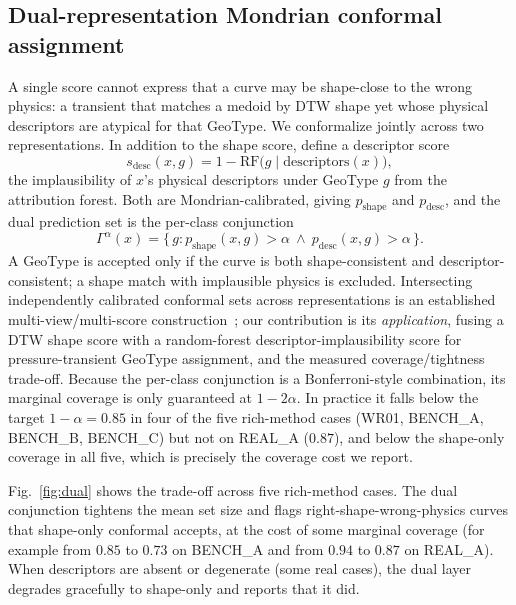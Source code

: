\documentclass[journal]{IEEEtran}
\begin{document}
\subsection{Dual-representation Mondrian conformal assignment}

A single score cannot express that a curve may be shape-close to the wrong physics: a transient
that matches a medoid by DTW shape yet whose physical descriptors are atypical for that GeoType. We
conformalize jointly across two representations. In addition to the shape score, define a descriptor
score
\begin{equation}
s_\text{desc}(x,g)=1-\mathrm{RF}\big(g\mid\text{descriptors}(x)\big),
\end{equation}
the implausibility of $x$'s physical descriptors under GeoType $g$ from the attribution forest.
Both are Mondrian-calibrated, giving $p_\text{shape}$ and $p_\text{desc}$, and the dual prediction
set is the per-class conjunction
\begin{equation}
\Gamma^\alpha(x)=\big\{\,g:p_\text{shape}(x,g)>\alpha\ \wedge\ p_\text{desc}(x,g)>\alpha\,\big\}.
\label{eq:dual}
\end{equation}
A GeoType is accepted only if the curve is both shape-consistent and descriptor-consistent; a shape
match with implausible physics is excluded. Intersecting independently calibrated conformal sets
across representations is an established multi-view/multi-score construction~\cite{garciaceja2024mv,xu2025alpha};
our contribution is its \emph{application}, fusing a DTW shape score with a random-forest
descriptor-implausibility score for pressure-transient GeoType assignment, and the measured
coverage/tightness trade-off. Because the per-class conjunction is a Bonferroni-style combination, its
marginal coverage is only guaranteed at $1-2\alpha$. In practice it falls below the target
$1-\alpha=0.85$ in four of the five rich-method cases (WR01, BENCH\_A, BENCH\_B, BENCH\_C) but not
on REAL\_A ($0.87$), and below the shape-only coverage in all five, which is precisely the coverage
cost we report.

Fig.~\ref{fig:dual} shows the trade-off across five rich-method cases. The dual conjunction
tightens the mean set size and flags right-shape-wrong-physics curves that shape-only conformal
accepts, at the cost of some marginal coverage (for example from $0.85$ to $0.73$ on BENCH\_A and
from $0.94$ to $0.87$ on REAL\_A). When descriptors are absent or degenerate (some real cases), the dual
layer degrades gracefully to shape-only and reports that it did.
\end{document}
